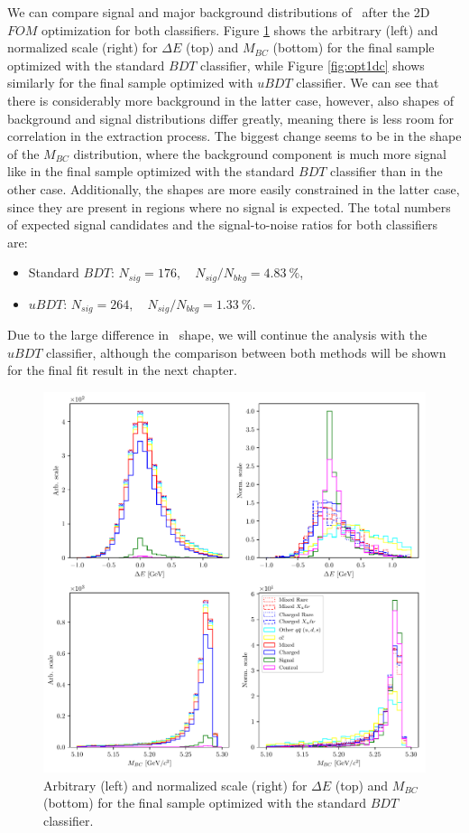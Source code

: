 We can compare signal and major background distributions of \vars~after the 2D $FOM$ optimization for both classifiers. Figure \ref{fig:opt01c} shows the arbitrary (left) and normalized scale (right) for $\Delta E$ (top) and $M_{BC}$ (bottom) for the final sample optimized with the standard $BDT$ classifier, while Figure \ref{fig:opt1dc} shows similarly for the final sample optimized with $uBDT$ classifier. We can see that there is considerably more background in the latter case, however, also shapes of background and signal distributions differ greatly, meaning there is less room for correlation in the extraction process. The biggest change seems to be in the shape of the $M_{BC}$ distribution, where the background component is much more signal like in the final sample optimized with the standard $BDT$ classifier than in the other case.  Additionally, the shapes are more easily constrained in the latter case, since they are present in regions where no signal is expected. The total numbers of expected signal candidates and the signal-to-noise ratios for both classifiers are:
\begin{itemize}
	\item Standard $BDT$: $N_{sig} = 176,\quad N_{sig}/N_{bkg} = 4.83~\%$,
	\item $uBDT$: $N_{sig} = 264,\quad N_{sig}/N_{bkg} = 1.33~\%$.
\end{itemize}
Due to the large difference in \vars~shape, we will continue the analysis with the $uBDT$ classifier, although the comparison between both methods will be shown for the final fit result in the next chapter.

\begin{figure}[H]
	\centering
	\captionsetup{width=0.8\linewidth}
	\includegraphics[width=\linewidth]{fig/opt_BB}
	\caption{Arbitrary (left) and normalized scale (right) for $\Delta E$ (top) and $M_{BC}$ (bottom) for the final sample optimized with the standard $BDT$ classifier.}
	\label{fig:opt01c}
\end{figure} 

